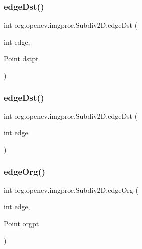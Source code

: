 \subsubsection{\texorpdfstring{edge\+Dst()}{edgeDst()}\hspace{0.1cm}{\footnotesize\ttfamily [1/2]}}
{\footnotesize\ttfamily int org.\+opencv.\+imgproc.\+Subdiv2\+D.\+edge\+Dst (\begin{DoxyParamCaption}\item[{int}]{edge,  }\item[{\mbox{\hyperlink{classorg_1_1opencv_1_1core_1_1_point}{Point}}}]{dstpt }\end{DoxyParamCaption})}

\mbox{\label{classorg_1_1opencv_1_1imgproc_1_1_subdiv2_d_a7755ad8fcb9c0b5a4a6eda9415b0d8f1}} 
\subsubsection{\texorpdfstring{edge\+Dst()}{edgeDst()}\hspace{0.1cm}{\footnotesize\ttfamily [2/2]}}
{\footnotesize\ttfamily int org.\+opencv.\+imgproc.\+Subdiv2\+D.\+edge\+Dst (\begin{DoxyParamCaption}\item[{int}]{edge }\end{DoxyParamCaption})}

\mbox{\label{classorg_1_1opencv_1_1imgproc_1_1_subdiv2_d_abc54b2a9d95aac6f4e3f5851103afa35}} 
\subsubsection{\texorpdfstring{edge\+Org()}{edgeOrg()}\hspace{0.1cm}{\footnotesize\ttfamily [1/2]}}
{\footnotesize\ttfamily int org.\+opencv.\+imgproc.\+Subdiv2\+D.\+edge\+Org (\begin{DoxyParamCaption}\item[{int}]{edge,  }\item[{\mbox{\hyperlink{classorg_1_1opencv_1_1core_1_1_point}{Point}}}]{orgpt }\end{DoxyParamCaption})}

